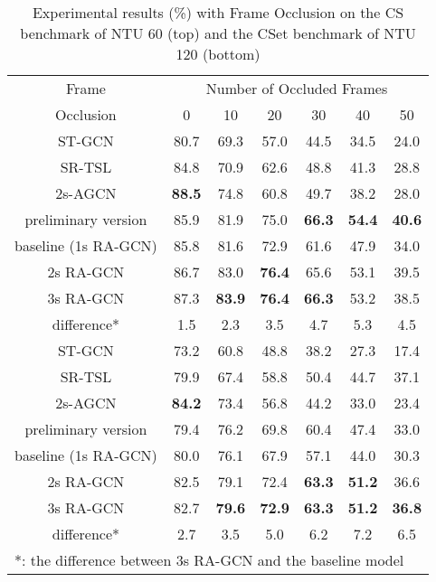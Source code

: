 \documentclass[journal]{IEEEtran}
\begin{document}
\begin{table}[t]
\caption{Experimental results (\%) with Frame Occlusion on the CS benchmark of NTU 60 (top) and the CSet benchmark of NTU 120 (bottom)}
\label{tab:frame}
\centering
\begin{tabular}{ccccccc}
\hline
Frame & \multicolumn{6}{c}{Number of Occluded Frames} \\
\cline{2-7}
Occlusion & 0 & 10 & 20 & 30 & 40 & 50 \\
\hline
\hline
ST-GCN \cite{yan2018spatial} & 80.7 & 69.3 & 57.0 & 44.5 & 34.5 & 24.0 \\
SR-TSL \cite{si2018skeleton} & 84.8 & 70.9 & 62.6 & 48.8 & 41.3 & 28.8 \\
2s-AGCN \cite{shi2019two} & {\bf 88.5} & 74.8 & 60.8 & 49.7 & 38.2 & 28.0 \\
preliminary version \cite{song2019richly} & 85.9 & 81.9 & 75.0 & {\bf 66.3} & {\bf 54.4} & {\bf 40.6} \\
baseline (1s RA-GCN) & 85.8 & 81.6 & 72.9 & 61.6 & 47.9 & 34.0 \\
2s RA-GCN & 86.7 & 83.0 & {\bf 76.4} & 65.6 & 53.1 & 39.5 \\
3s RA-GCN & 87.3 & {\bf 83.9} & {\bf 76.4} & {\bf 66.3} & 53.2 & 38.5 \\
difference* & 1.5 & 2.3 & 3.5 & 4.7 & 5.3 & 4.5 \\
\hline
\hline
ST-GCN \cite{yan2018spatial} & 73.2 & 60.8 & 48.8 & 38.2 & 27.3 & 17.4 \\
SR-TSL \cite{si2018skeleton} & 79.9 & 67.4 & 58.8 & 50.4 & 44.7 & 37.1 \\
2s-AGCN \cite{shi2019two} & {\bf 84.2} & 73.4 & 56.8 & 44.2 & 33.0 & 23.4 \\
preliminary version \cite{song2019richly} & 79.4 & 76.2 & 69.8 & 60.4 & 47.4 & 33.0 \\
baseline (1s RA-GCN) & 80.0 & 76.1 & 67.9 & 57.1 & 44.0 & 30.3 \\
2s RA-GCN & 82.5 & 79.1 & 72.4 & {\bf 63.3} & {\bf 51.2} & 36.6 \\
3s RA-GCN & 82.7 & {\bf 79.6} & {\bf 72.9} & {\bf 63.3} & {\bf 51.2} & {\bf 36.8} \\
difference* & 2.7 & 3.5 & 5.0 & 6.2 & 7.2 & 6.5 \\
\hline
\multicolumn{7}{l}{*: the difference between 3s RA-GCN and the baseline model}
\end{tabular}
\vspace{-0.4cm}
\end{table}
\end{document}
